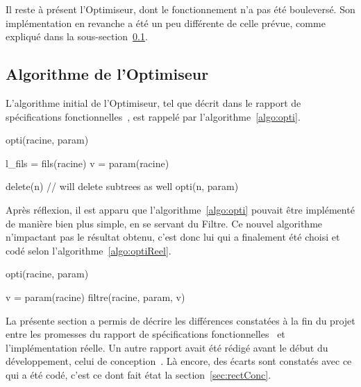     Il reste à présent l'Optimiseur, dont le fonctionnement n'a pas été bouleversé. Son implémentation en revanche a été un peu différente de celle prévue, comme expliqué dans la {\sc sous-section}~\ref{ssec:algoOptim}.

\subsection{Algorithme de l'Optimiseur}
\label{ssec:algoOptim}

    L'algorithme initial de l'Optimiseur, tel que décrit dans le rapport de spécifications fonctionnelles~\cite{spec_fonc}, est rappelé par l'{\sc algorithme}~\ref{algo:opti}.

         \begin{algorithm}[H]
            \caption{opti(racine, param)}
            \label{algo:opti}
            \begin{algorithmic}
                \STATE l\_fils = fils(racine)
                    \RETURN
                \ENDIF
                \STATE
                    \STATE v = param(racine)

                            \STATE delete(n) // will delete subtrees as well
                        \ENDIF
                    \ENDFOR
                \ENDIF
                \STATE
                    \STATE opti(n, param)
                \ENDFOR
            \end{algorithmic}
        \end{algorithm}

Après réflexion, il est apparu que l'{\sc algorithme}~\ref{algo:opti} pouvait être implémenté de manière bien plus simple, en se servant du Filtre. Ce nouvel algorithme n'impactant pas le résultat obtenu, c'est donc lui qui a finalement été choisi et codé selon l'{\sc algorithme}~\ref{algo:optiReel}.

	\begin{algorithm}[H]
            \caption{opti(racine, param)}
            \label{algo:optiReel}
            \begin{algorithmic}
		\STATE v = param(racine)
		\STATE filtre(racine, param, v)
            \end{algorithmic}
        \end{algorithm}

    La présente section a permis de décrire les différences constatées à la fin du projet entre les promesses du rapport de spécifications fonctionnelles~\cite{spec_fonc} et l'implémentation réelle. Un autre rapport avait été rédigé avant le début du développement, celui de conception~\cite{conception}. Là encore, des écarts sont constatés avec ce qui a été codé, c'est ce dont fait état la {\sc section}~\ref{sec:rectConc}. 

